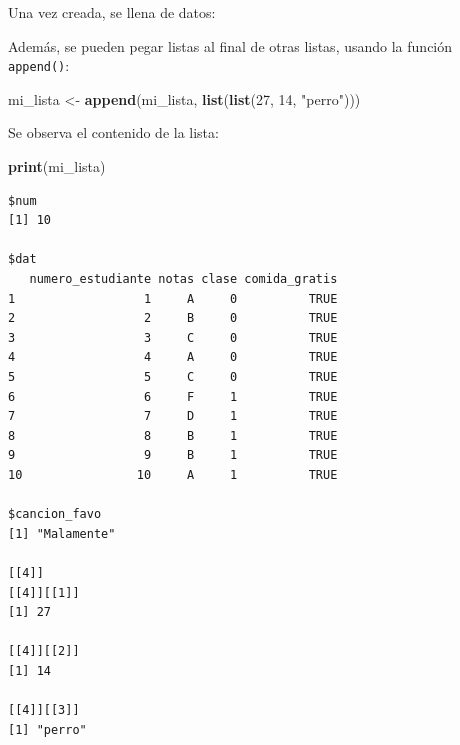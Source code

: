 \documentclass[
]{article}
\newenvironment{Shaded}{\begin{snugshade}}{\end{snugshade}}
\newcommand{\DecValTok}[1]{\textcolor[rgb]{0.00,0.00,0.81}{#1}}
\newcommand{\FunctionTok}[1]{\textcolor[rgb]{0.13,0.29,0.53}{\textbf{#1}}}
\newcommand{\NormalTok}[1]{#1}
\newcommand{\OtherTok}[1]{\textcolor[rgb]{0.56,0.35,0.01}{#1}}
\newcommand{\SpecialCharTok}[1]{\textcolor[rgb]{0.81,0.36,0.00}{\textbf{#1}}}
\newcommand{\StringTok}[1]{\textcolor[rgb]{0.31,0.60,0.02}{#1}}
\begin{document}
Una vez creada, se llena de datos:

\begin{Shaded}
\end{Shaded}

Además, se pueden pegar listas al final de otras listas, usando la función \texttt{append()}:

\begin{Shaded}
\begin{Highlighting}[]
\NormalTok{mi\_lista }\OtherTok{\textless{}{-}} \FunctionTok{append}\NormalTok{(mi\_lista, }\FunctionTok{list}\NormalTok{(}\FunctionTok{list}\NormalTok{(}\DecValTok{27}\NormalTok{, }\DecValTok{14}\NormalTok{, }\StringTok{"perro"}\NormalTok{)))}
\end{Highlighting}
\end{Shaded}

Se observa el contenido de la lista:

\begin{Shaded}
\begin{Highlighting}[]
\FunctionTok{print}\NormalTok{(mi\_lista)}
\end{Highlighting}
\end{Shaded}

\begin{verbatim}
$num
[1] 10

$dat
   numero_estudiante notas clase comida_gratis
1                  1     A     0          TRUE
2                  2     B     0          TRUE
3                  3     C     0          TRUE
4                  4     A     0          TRUE
5                  5     C     0          TRUE
6                  6     F     1          TRUE
7                  7     D     1          TRUE
8                  8     B     1          TRUE
9                  9     B     1          TRUE
10                10     A     1          TRUE

$cancion_favo
[1] "Malamente"

[[4]]
[[4]][[1]]
[1] 27

[[4]][[2]]
[1] 14

[[4]][[3]]
[1] "perro"
\end{verbatim}
\end{document}
